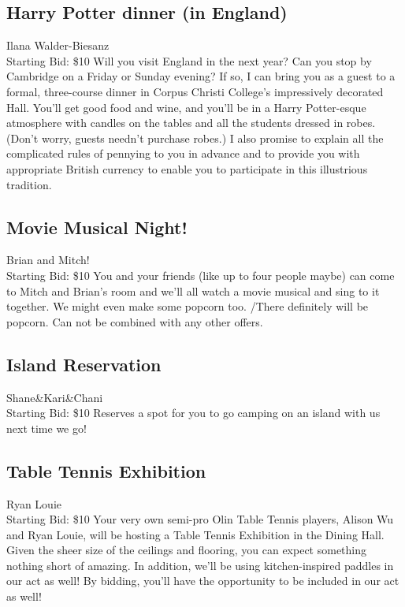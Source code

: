 \documentclass[11pt]{article}
\begin{document}
\subsection{Harry Potter dinner (in England)}
Ilana Walder-Biesanz
\\
Starting Bid: \$10
\newline
Will you visit England in the next year? Can you stop by Cambridge on a Friday or Sunday evening? If so, I can bring you as a guest to a formal, three-course dinner in Corpus Christi College's impressively decorated Hall. You'll get good food and wine, and you'll be in a Harry Potter-esque atmosphere with candles on the tables and all the students dressed in robes. (Don't worry, guests needn't purchase robes.) I also promise to explain all the complicated rules of pennying to you in advance and to provide you with appropriate British currency to enable you to participate in this illustrious tradition.
\subsection{Movie Musical Night!}
Brian and Mitch!
\\
Starting Bid: \$10
\newline
You and your friends (like up to four people maybe) can come to Mitch and Brian's room and we'll all watch a movie musical and sing to it together. We might even make some popcorn too. /There definitely will be popcorn. Can not be combined with any other offers.
\subsection{Island Reservation}
Shane\&Kari\&Chani
\\
Starting Bid: \$10
\newline
Reserves a spot for you to go camping on an island with us next time we go!
\subsection{Table Tennis Exhibition}
Ryan Louie
\\
Starting Bid: \$10
\newline
Your very own semi-pro Olin Table Tennis players, Alison Wu and Ryan Louie, will be hosting a Table Tennis Exhibition in the Dining Hall. Given the sheer size of the ceilings and flooring, you can expect something nothing short of amazing.  In addition, we'll be using kitchen-inspired paddles in our act as well!  By bidding, you'll have the opportunity to be included in our act as well!
\end{document}
